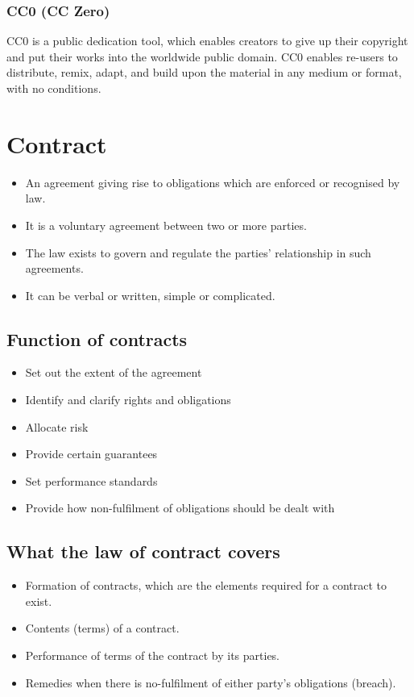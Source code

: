 \documentclass[11pt]{article}
\begin{document}
\subsubsection{CC0 (CC Zero)}
\label{sec:org92cdfce}
CC0 is a public dedication tool, which enables creators to give up their copyright and put their works into the worldwide public domain. CC0 enables re-users to distribute, remix, adapt, and build upon the material in any medium or format, with no conditions.

 \newpage

\section{Contract}
\label{sec:org24e9ac0}
\begin{itemize}
\item An agreement giving rise to obligations which are enforced or recognised by law.
\item It is a voluntary agreement between two or more parties.
\item The law exists to govern and regulate the parties' relationship in such agreements.
\item It can be verbal or written, simple or complicated.
\end{itemize}

\subsection{Function of contracts}
\label{sec:org686f1f7}
\begin{itemize}
\item Set out the extent of the agreement
\item Identify and clarify rights and obligations
\item Allocate risk
\item Provide certain guarantees
\item Set performance standards
\item Provide how non-fulfilment of obligations should be dealt with
\end{itemize}

\subsection{What the law of contract covers}
\label{sec:org222d6d6}
\begin{itemize}
\item Formation of contracts, which are the elements required for a contract to exist.
\item Contents (terms) of a contract.
\item Performance of terms of the contract by its parties.
\item Remedies when there is no-fulfilment of either party's obligations (breach).
\end{itemize}
\end{document}
